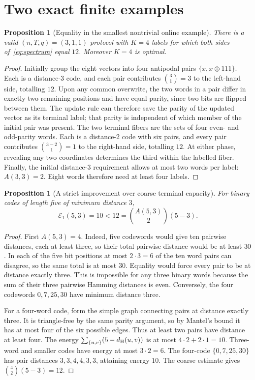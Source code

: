 \documentclass[11pt,a4paper]{article}
\newtheorem{proposition}[theorem]{Proposition}
\newcommand{\dist}{d_{\rm H}}
\begin{document}
\section{Two exact finite examples}
\begin{proposition}[Equality in the smallest nontrivial online example]\label{prop:n3}
There is a valid $(n,T,q)=(3,1,1)$ protocol with $K=4$ labels for which both sides of~\eqref{eq:spectrum} equal $12$. Moreover $K=4$ is optimal.
\end{proposition}
\begin{proof}
Initially group the eight vectors into four antipodal pairs $\{x,x\oplus111\}$. Each is a distance-$3$ code, and each pair contributes $\binom31=3$ to the left-hand side, totalling $12$. Upon any common overwrite, the two words in a pair differ in exactly two remaining positions and have equal parity, since two bits are flipped between them. The update rule can therefore save the parity of the updated vector as its terminal label; that parity is independent of which member of the initial pair was present. The two terminal fibers are the sets of four even- and odd-parity words. Each is a distance-$2$ code with six pairs, and every pair contributes $\binom{3-2}{1}=1$ to the right-hand side, totalling $12$. At either phase, revealing any two coordinates determines the third within the labelled fiber. Finally, the initial distance-$3$ requirement allows at most two words per label: $A(3,3)=2$. Eight words therefore need at least four labels.
\end{proof}

\begin{proposition}[A strict improvement over coarse terminal capacity]\label{prop:n5}
For binary codes of length five of minimum distance $3$,
\[
\boxed{\mathcal E_1(5,3)=10<12=\binom{A(5,3)}2(5-3).}
\]
\end{proposition}
\begin{proof}
First $A(5,3)=4$. Indeed, five codewords would give ten pairwise distances, each at least three, so their total pairwise distance would be at least $30$. In each of the five bit positions at most $2\cdot3=6$ of the ten word pairs can disagree, so the same total is at most $30$. Equality would force every pair to be at distance exactly three. This is impossible for any three binary words because the sum of their three pairwise Hamming distances is even. Conversely, the four codewords $0,7,25,30$ have minimum distance three.

For a four-word code, form the simple graph connecting pairs at distance exactly three. It is triangle-free by the same parity argument, so by Mantel's bound it has at most four of the six possible edges. Thus at least two pairs have distance at least four. The energy $\sum_{\{u,v\}}(5-\dist(u,v))$ is at most $4\cdot2+2\cdot1=10$. Three-word and smaller codes have energy at most $3\cdot2=6$. The four-code $\{0,7,25,30\}$ has pair distances $3,3,4,4,3,3$, attaining energy $10$. The coarse estimate gives $\binom42(5-3)=12$.
\end{proof}
\end{document}

